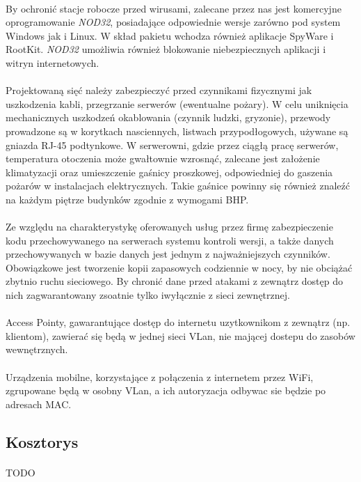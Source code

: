 \paragraph{}
By ochronić stacje robocze przed wirusami, zalecane przez nas jest komercyjne oprogramowanie \textit{NOD32}, posiadające odpowiednie wersje zarówno pod system Windows jak i Linux. W skład pakietu wchodza również aplikacje SpyWare i RootKit. \textit{NOD32} umożliwia również blokowanie niebezpiecznych aplikacji i witryn internetowych.

\paragraph{}
Projektowaną sięć należy zabezpieczyć przed czynnikami fizycznymi jak uszkodzenia kabli, przegrzanie serwerów (ewentualne pożary). W celu uniknięcia mechanicznych uszkodzeń okablowania (czynnik ludzki, gryzonie), przewody prowadzone są w korytkach nasciennych, listwach przypodłogowych, używane są gniazda RJ-45 podtynkowe. W serwerowni, gdzie przez ciągłą pracę serwerów, temperatura otoczenia może gwałtownie wzrosnąć, zalecane jest założenie klimatyzacji oraz umieszczenie gaśnicy proszkowej, odpowiedniej do gaszenia pożarów w instalacjach elektrycznych. Takie gaśnice powinny się również znaleźć na każdym piętrze budynków zgodnie z wymogami BHP.

\paragraph{}
Ze względu na charakterystykę oferowanych usług przez firmę zabezpieczenie kodu przechowywanego na serwerach systemu kontroli wersji, a także danych przechowywanych w bazie danych jest jednym z najważniejszych czynników. Obowiązkowe jest tworzenie kopii zapasowych codziennie w nocy, by nie obciążać zbytnio ruchu sieciowego. By chronić dane przed atakami z zewnątrz dostęp do nich zagwarantowany zsoatnie tylko iwyłącznie z sieci zewnętrznej.

\paragraph{}
Access Pointy, gawarantujące dostęp do internetu uzytkownikom z zewnątrz (np. klientom), zawierać się będą w jednej sieci VLan, nie mającej dostepu do zasobów wewnętrznych.

\paragraph{}
Urządzenia mobilne, korzystające z połączenia z internetem przez WiFi, zgrupowane będą w osobny VLan, a ich autoryzacja odbywac sie będzie po adresach MAC.

\subsection{Kosztorys}
\paragraph{}
TODO